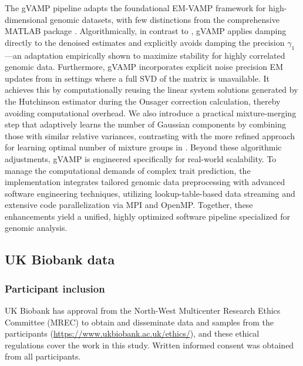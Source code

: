 The gVAMP pipeline adapts the foundational EM-VAMP framework for high-dimensional genomic datasets, with few distinctions from the comprehensive MATLAB package \cite{schniter2021gampmatlab}. Algorithmically, in contrast to \cite{schniter2021gampmatlab}, gVAMP applies damping directly to the denoised estimates \cite{rangan_vector_2019} and explicitly avoids damping the precision $\gamma_1$—an adaptation empirically shown to maximize stability for highly correlated genomic data. Furthermore, gVAMP incorporates explicit noise precision EM updates from \cite{LearningFreeEnergies2018} in settings where a full SVD of the matrix is unavailable. It achieves this by computationally reusing the linear system solutions generated by the Hutchinson estimator during the Onsager correction calculation, thereby avoiding computational overhead. We also introduce a practical mixture-merging step that adaptively learns the number of Gaussian components by combining those with similar relative variances, contrasting with the more refined approach for learning optimal number of mixture groups in \cite{EMGAMP2012}. Beyond these algorithmic adjustments, gVAMP is engineered specifically for real-world scalability. To manage the computational demands of complex trait prediction, the implementation integrates tailored genomic data preprocessing with advanced software engineering techniques, utilizing lookup-table-based data streaming and extensive code parallelization via MPI and OpenMP. Together, these enhancements yield a unified, highly optimized software pipeline specialized for genomic analysis.

\subsection{UK Biobank data}

\subsubsection{Participant inclusion}
UK Biobank has approval from the North-West Multicenter Research Ethics Committee (MREC) to obtain and disseminate data and samples from the participants (\url{https://www.ukbiobank.ac.uk/ethics/}), and these ethical regulations cover the work in this study. Written informed consent was obtained from all participants. 

